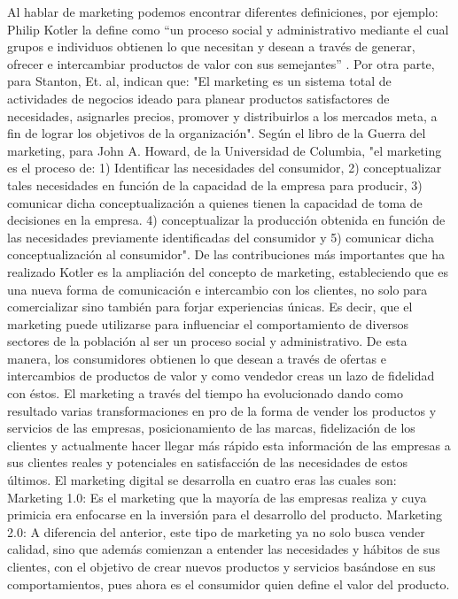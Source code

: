 \documentclass[12pt]{difu100cia} %
\begin{document}
Al hablar de marketing podemos encontrar diferentes definiciones, por ejemplo: Philip Kotler la define como “un proceso social y administrativo mediante el cual grupos e individuos obtienen lo que necesitan y desean a través de generar, ofrecer e intercambiar productos de valor con sus semejantes” .
Por otra parte, para Stanton, Et. al, indican que: "El marketing es un sistema total de actividades de negocios ideado para planear productos satisfactores de necesidades, asignarles precios, promover y distribuirlos a los mercados meta, a fin de lograr los objetivos de la organización".
Según el libro de la Guerra del marketing, para John A. Howard, de la Universidad de Columbia, "el marketing es el proceso de: 1) Identificar las necesidades del consumidor, 2) conceptualizar tales necesidades en función de la capacidad de la empresa para producir, 3) comunicar dicha conceptualización a quienes tienen la capacidad de toma de decisiones en la empresa. 4) conceptualizar la producción obtenida en función de las necesidades previamente identificadas del consumidor y 5) comunicar dicha conceptualización al consumidor".
De las contribuciones más importantes que ha realizado Kotler es la ampliación del concepto de marketing, estableciendo que es una nueva forma de comunicación e intercambio con los clientes, no solo para comercializar sino también para forjar experiencias únicas. Es decir, que el marketing puede utilizarse para influenciar el comportamiento de diversos sectores de la población al ser un proceso social y administrativo. De esta manera, los consumidores obtienen lo que desean a través de ofertas e intercambios de productos de valor y como vendedor creas un lazo de fidelidad con éstos.  
El marketing a través del tiempo ha evolucionado dando como resultado varias transformaciones en pro de la forma de vender los productos y servicios de las empresas, posicionamiento de las marcas, fidelización de los clientes y actualmente hacer llegar más rápido esta información de las empresas a sus clientes reales y potenciales en satisfacción de las necesidades de estos últimos.
El marketing digital se desarrolla en cuatro eras las cuales son:
Marketing 1.0: Es el marketing que la mayoría de las empresas realiza y cuya primicia era enfocarse en la inversión para el desarrollo del producto. 
Marketing 2.0: A diferencia del anterior, este tipo de marketing ya no solo busca vender calidad, sino que además comienzan a entender las necesidades y hábitos de sus clientes, con el objetivo de crear nuevos productos y servicios basándose en sus comportamientos, pues ahora es el consumidor quien define el valor del producto. 
\end{document}
